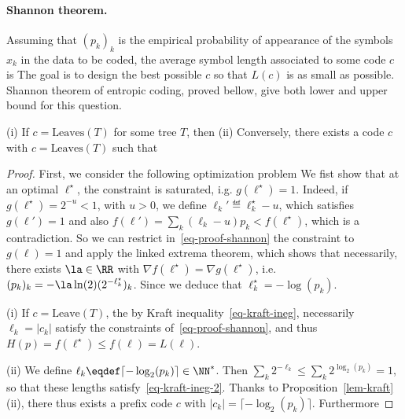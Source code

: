 \paragraph{Shannon theorem.}

%
Assuming that $(p_k)_k$ is the empirical probability of appearance of the symbols $x_k$ in the data to be coded, the average symbol length associated to some code $c$ is 
The goal is to design the best possible $c$ so that $L(c)$ is as small as possible.
%
Shannon theorem of entropic coding, proved bellow, give both lower and upper bound for this question. 

\begin{thm}
	(i) If $c=\text{Leaves}(T)$ for some tree $T$, then 
	(ii) Conversely, there exists a code $c$ with $c=\text{Leaves}(T)$ such that 
\end{thm} 

\begin{proof}
	First, we consider the following optimization problem
	We fist show that at an optimal $\ell^\star$, the constraint is saturated, i.g. $g(\ell^\star)=1$. Indeed, if $g(\ell^\star)=2^{-u} < 1$, with $u>0$, we define $\ell_k' \eqdef \ell_k^\star-u$, which satisfies $g(\ell') = 1$ and also $f(\ell')=\sum_k (\ell_k-u) p_k < f(\ell^\star)$, which is a contradiction.
	So we can restrict in~\eqref{eq-proof-shannon} the constraint to $g(\ell)=1$ and apply the linked extrema theorem, which shows that necessarily, there exists $\la \in \RR$ with $\nabla f(\ell^\star)=\nabla g(\ell^\star)$, i.e.  $(p_k)_k = -\la \ln(2) (2^{-\ell_k^\star})_k$. Since 
	we deduce that $\ell^\star_k = -\log(p_k)$. 
	
	(i) If $c=\text{Leave}(T)$, the by Kraft inequality~\eqref{eq-kraft-ineg}, necessarily $\ell_k=|c_k|$ satisfy the constraints of~\eqref{eq-proof-shannon}, and thus $H(p) = f(\ell^\star) \leq f(\ell) = L(\ell)$.
	
	(ii) We define $\ell_k \eqdef \lceil -\log_2(p_k) \rceil \in \NN^*$. Then $\sum_k 2^{-\ell_k} \leq \sum_k 2^{\log_2(p_k)} = 1$, so that these lengths satisfy~\eqref{eq-kraft-ineg-2}. Thanks to Proposition~\ref{lem-kraft} (ii), there thus exists a prefix code $c$ with $|c_k|=\lceil -\log_2(p_k) \rceil$. Furthermore
\end{proof}

